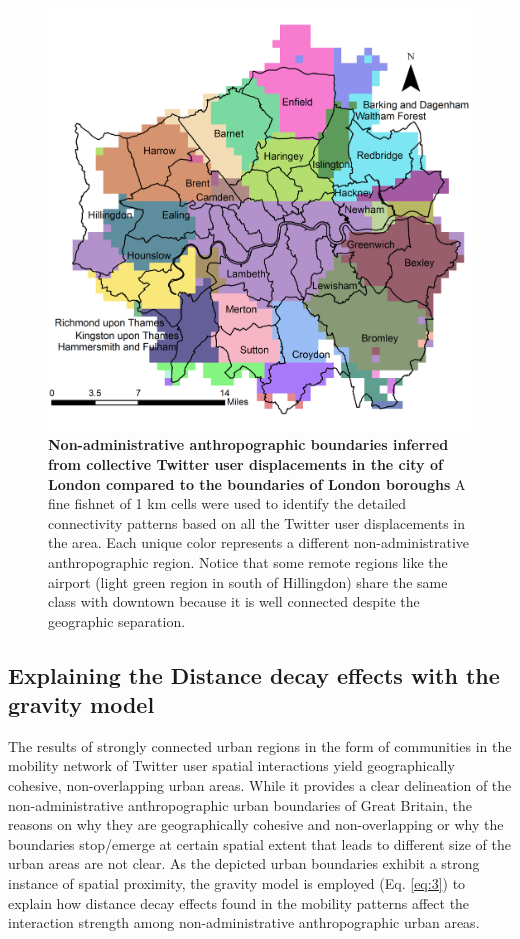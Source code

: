 \documentclass[]{tGIS2e}
\begin{document}
\begin{figure}[ht]
\begin{center}
\includegraphics[width=0.7\linewidth]{./figure/S7_london}
\caption{{\bf Non-administrative anthropographic boundaries inferred from collective Twitter user displacements in the city of London compared to the boundaries of London boroughs}  A fine fishnet of 1 km cells were used to identify the detailed connectivity patterns based on all the Twitter user displacements in the area.  Each unique color represents a different non-administrative anthropographic region. Notice that some remote regions like the airport (light green region in south of Hillingdon) share the same class with downtown because it is well connected despite the geographic separation.}
\label{S7_Fig}
\end{center}
\end{figure}

\subsection{Explaining the Distance decay effects with the gravity model}
The results of strongly connected urban regions in the form of communities in the mobility network of Twitter user spatial interactions yield geographically cohesive, non-overlapping urban areas. 
While it provides a clear delineation of the non-administrative anthropographic urban boundaries of Great Britain, the reasons on why they are geographically cohesive and non-overlapping or why the boundaries stop/emerge at certain spatial extent that leads to different size of the urban areas are not clear. 
As the depicted urban boundaries exhibit a strong instance of spatial proximity, the gravity model is employed (Eq. \eqref{eq:3}) to explain how distance decay effects found in the mobility patterns affect the interaction strength among non-administrative anthropographic urban areas.
\end{document}
